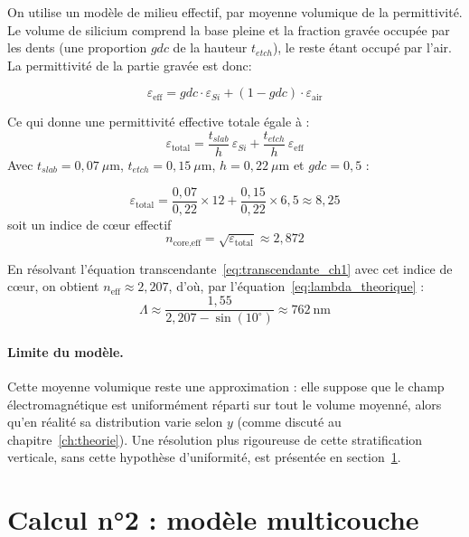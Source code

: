 \documentclass[a4paper,11pt]{report}
\begin{document}
On utilise un modèle de milieu effectif, par moyenne volumique de la permittivité. Le volume de silicium comprend la base pleine et la fraction gravée occupée par les dents (une proportion $gdc$ de la hauteur $t_{etch}$), le reste étant occupé par l'air. La permittivité de la partie gravée est donc:

\begin{equation}
\varepsilon_{\text{eff}} = gdc\cdot\varepsilon_{Si} + (1-gdc)\cdot\varepsilon_{\text{air}}
\end{equation}

Ce qui donne une permittivité effective totale égale à :
\begin{equation}
\varepsilon_{\text{total}} = \frac{t_{slab}}{h}\,\varepsilon_{Si} + \frac{t_{etch}}{h}\,\varepsilon_{\text{eff}}
\end{equation}
Avec $t_{slab}=0{,}07~\mu\text{m}$, $t_{etch}=0{,}15~\mu\text{m}$, $h=0{,}22~\mu\text{m}$ et $gdc=0{,}5$ :

\begin{equation}
\varepsilon_{\text{total}} = \frac{0{,}07}{0{,}22}\times12 + \frac{0{,}15}{0{,}22}\times6{,}5 \approx 8{,}25
\end{equation}
soit un indice de cœur effectif
\begin{equation}
n_{\text{core,eff}} = \sqrt{\varepsilon_{\text{total}}} \approx 2{,}872
\end{equation}

En résolvant l'équation transcendante~\eqref{eq:transcendante_ch1} avec cet indice de cœur, on obtient $n_{\text{eff}}\approx2{,}207$, d'où, par l'équation~\eqref{eq:lambda_theorique} :
\begin{equation}
\Lambda \approx \frac{1{,}55}{2{,}207-\sin(10^\circ)} \approx 762~\text{nm}
\end{equation}

\paragraph{Limite du modèle.} Cette moyenne volumique reste une approximation : elle suppose que le champ électromagnétique est uniformément réparti sur tout le volume moyenné, alors qu'en réalité sa distribution varie selon $y$ (comme discuté au chapitre~\ref{ch:theorie}). Une résolution plus rigoureuse de cette stratification verticale, sans cette hypothèse d'uniformité, est présentée en section~\ref{sec:calcul2}. 

\section{Calcul n°2 : modèle multicouche}
\label{sec:calcul2}
\end{document}
